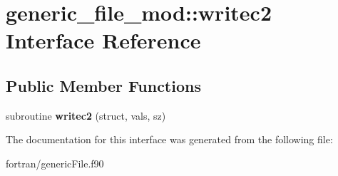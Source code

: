 \hypertarget{interfacegeneric__file__mod_1_1writec2}{}\section{generic\+\_\+file\+\_\+mod\+:\+:writec2 Interface Reference}
\label{interfacegeneric__file__mod_1_1writec2}
\subsection*{Public Member Functions}
\begin{DoxyCompactItemize}
\item 
\mbox{\label{interfacegeneric__file__mod_1_1writec2_a30e2e66c2215dda242e86cf1f3a8d530}} 
subroutine {\bfseries writec2} (struct, vals, sz)
\end{DoxyCompactItemize}


The documentation for this interface was generated from the following file\+:\begin{DoxyCompactItemize}
\item 
fortran/generic\+File.\+f90\end{DoxyCompactItemize}
